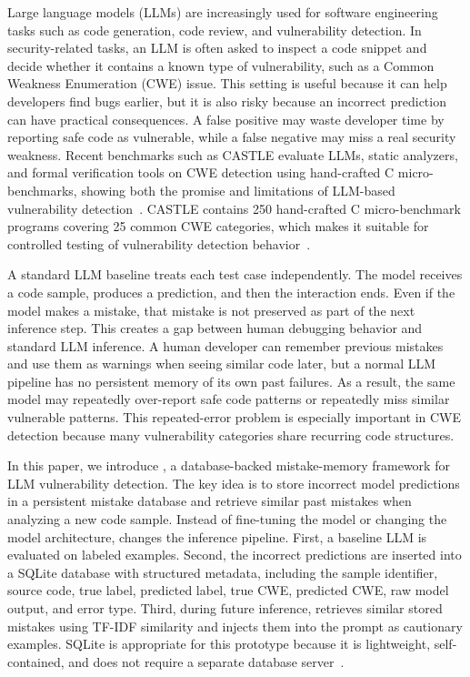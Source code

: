 \label{sec:intro}

Large language models (LLMs) are increasingly used for software engineering tasks such as code generation, code review, and vulnerability detection. In security-related tasks, an LLM is often asked to inspect a code snippet and decide whether it contains a known type of vulnerability, such as a Common Weakness Enumeration (CWE) issue. This setting is useful because it can help developers find bugs earlier, but it is also risky because an incorrect prediction can have practical consequences. A false positive may waste developer time by reporting safe code as vulnerable, while a false negative may miss a real security weakness. Recent benchmarks such as CASTLE evaluate LLMs, static analyzers, and formal verification tools on CWE detection using hand-crafted C micro-benchmarks, showing both the promise and limitations of LLM-based vulnerability detection~\cite{castle,castle_github}. CASTLE contains 250 hand-crafted C micro-benchmark programs covering 25 common CWE categories, which makes it suitable for controlled testing of vulnerability detection behavior~\cite{castle_github}.

A standard LLM baseline treats each test case independently. The model receives a code sample, produces a prediction, and then the interaction ends. Even if the model makes a mistake, that mistake is not preserved as part of the next inference step. This creates a gap between human debugging behavior and standard LLM inference. A human developer can remember previous mistakes and use them as warnings when seeing similar code later, but a normal LLM pipeline has no persistent memory of its own past failures. As a result, the same model may repeatedly over-report safe code patterns or repeatedly miss similar vulnerable patterns. This repeated-error problem is especially important in CWE detection because many vulnerability categories share recurring code structures.

In this paper, we introduce \system, a database-backed mistake-memory framework for LLM vulnerability detection. The key idea is to store incorrect model predictions in a persistent mistake database and retrieve similar past mistakes when analyzing a new code sample. Instead of fine-tuning the model or changing the model architecture, \system changes the inference pipeline. First, a baseline LLM is evaluated on labeled examples. Second, the incorrect predictions are inserted into a SQLite database with structured metadata, including the sample identifier, source code, true label, predicted label, true CWE, predicted CWE, raw model output, and error type. Third, during future inference, \system retrieves similar stored mistakes using TF-IDF similarity and injects them into the prompt as cautionary examples. SQLite is appropriate for this prototype because it is lightweight, self-contained, and does not require a separate database server~\cite{sqlite}.

